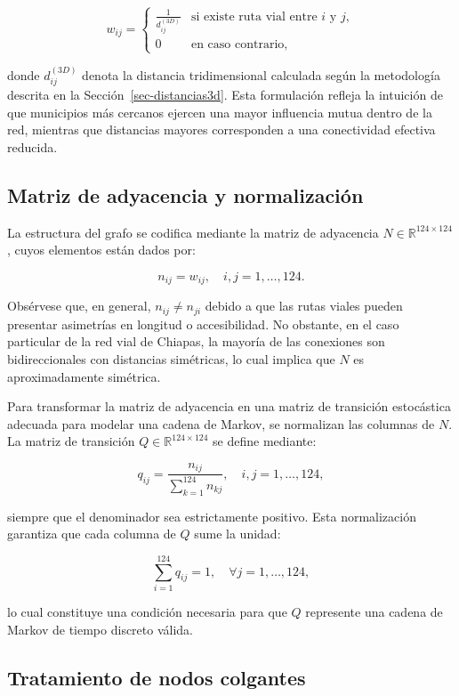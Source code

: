 \documentclass[
  spanish,
  us-letterpaper,
]{scrreprt}
\numberwithin{equation}{section}
\begin{document}
\[
w_{ij} = \begin{cases}
\displaystyle \frac{1}{d_{ij}^{(3D)}} & \text{si existe ruta vial entre } i \text{ y } j, \\
0 & \text{en caso contrario},
\end{cases}
\]

donde \(d_{ij}^{(3D)}\) denota la distancia tridimensional calculada
según la metodología descrita en la Sección~\ref{sec-distancias3d}. Esta
formulación refleja la intuición de que municipios más cercanos ejercen
una mayor influencia mutua dentro de la red, mientras que distancias
mayores corresponden a una conectividad efectiva reducida.

\subsection{Matriz de adyacencia y
normalización}\label{matriz-de-adyacencia-y-normalizaciuxf3n}

La estructura del grafo se codifica mediante la matriz de adyacencia
\(N \in \mathbb{R}^{124 \times 124}\), cuyos elementos están dados por:

\[
n_{ij} = w_{ij}, \quad i,j = 1,\dots,124.
\]

Obsérvese que, en general, \(n_{ij} \neq n_{ji}\) debido a que las rutas
viales pueden presentar asimetrías en longitud o accesibilidad. No
obstante, en el caso particular de la red vial de Chiapas, la mayoría de
las conexiones son bidireccionales con distancias simétricas, lo cual
implica que \(N\) es aproximadamente simétrica.

Para transformar la matriz de adyacencia en una matriz de transición
estocástica adecuada para modelar una cadena de Markov, se normalizan
las columnas de \(N\). La matriz de transición
\(Q \in \mathbb{R}^{124 \times 124}\) se define mediante:

\[
q_{ij} = \frac{n_{ij}}{\sum_{k=1}^{124} n_{kj}}, \quad i,j = 1,\dots,124,
\]

siempre que el denominador sea estrictamente positivo. Esta
normalización garantiza que cada columna de \(Q\) sume la unidad:

\[
\sum_{i=1}^{124} q_{ij} = 1, \quad \forall j = 1,\dots,124,
\]

lo cual constituye una condición necesaria para que \(Q\) represente una
cadena de Markov de tiempo discreto válida.

\subsection{Tratamiento de nodos
colgantes}\label{tratamiento-de-nodos-colgantes}
\end{document}
